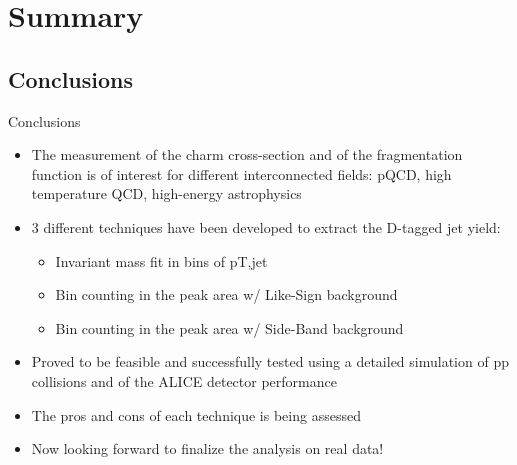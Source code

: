 \documentclass{beamer}
\begin{document}
\section*{Summary}

\subsection*{Conclusions}
\begin{frame}{Conclusions}
\begin{itemize}
\item The measurement of the charm cross-section and of the fragmentation function is of interest for different interconnected fields: 
pQCD, high temperature QCD, high-energy astrophysics
\item 3 different techniques have been developed to extract the D-tagged jet yield:
\begin{itemize}
\item Invariant mass fit in bins of pT,jet
\item Bin counting in the peak area w/ Like-Sign background
\item Bin counting in the peak area w/ Side-Band background
\end{itemize}
\item Proved to be feasible and successfully tested using a detailed simulation of pp collisions and of the ALICE detector performance
\item The pros and cons of each technique is being assessed
\item Now looking forward to finalize the analysis on real data!
\end{itemize}
\end{frame}
\end{document}

